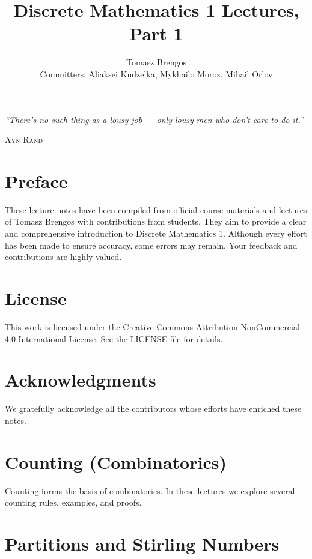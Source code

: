 \documentclass{article}
\title{Discrete Mathematics 1 Lectures, Part 1}
\author{Tomasz Brengos \\  
Committers: Aliaksei Kudzelka, Mykhailo Moroz, Mihail Orlov}
\date{}
\newcommand{\includelectureSub}[1]{%
  \begingroup
    \renewcommand{\section}{\subsection}%
  \endgroup
}
\begin{document}
\maketitle

\epigraph{\textit{``There's no such thing as a lousy job --- only lousy men who don't care to do it.''}}{\textsc{Ayn Rand}}

\vspace{6cm}

\section*{Preface}
These lecture notes have been compiled from official course materials and lectures of Tomasz Brengos with contributions from students. They aim to provide a clear and comprehensive introduction to Discrete Mathematics 1. Although every effort has been made to ensure accuracy, some errors may remain. Your feedback and contributions are highly valued.

\section*{License}
This work is licensed under the \href{https://creativecommons.org/licenses/by-nc/4.0/}{Creative Commons Attribution-NonCommercial 4.0 International License}. See the LICENSE file for details.


\section*{Acknowledgments}
We gratefully acknowledge all the contributors whose efforts have enriched these notes.

\cleardoublepage

\tableofcontents
\clearpage

\section{Counting (Combinatorics)}
Counting forms the basis of combinatorics. In these lectures we explore several counting rules, examples, and proofs.
\includelectureSub{Counting}

\section{Partitions and Stirling Numbers}
\includelectureSub{Partitions_StirlingNumbers}
\end{document}
